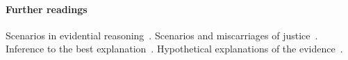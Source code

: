 \documentclass[10pt]{article}
\begin{document}

\paragraph{Further readings} 
Scenarios in evidential reasoning~\citep{bennettFeldman1981,penningtonHastie1993,penningtonHastie1993StoryModel}. Scenarios and miscarriages of justice~\citep{wagenaarEtal1993}. Inference to the best explanation~\citep{pardoAllen2008}. Hypothetical explanations of the evidence~\citep{thagard1989}. 
\end{document}
